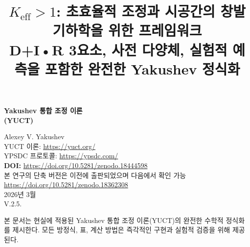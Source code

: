 \documentclass[11pt,a4paper]{article}
\title{$K_{\mathrm{eff}} > 1$: 초효율적 조정과 시공간의 창발 기하학을 위한 프레임워크 \\ 
	\large D+I•R 3요소, 사전 다양체, 실험적 예측을 포함한 완전한 Yakushev 정식화}
\begin{document}
	
	\begin{titlepage}
		\begin{center}
			\vspace*{3cm}
			\Huge\textbf{Yakushev 통합 조정 이론\\ (YUCT)}
			\vspace{2cm}
			
			\Large
			Alexey V. Yakushev\\
			\vspace{2cm}
			YUCT 이론: \url{https://yuct.org/}\\
			YPSDC 프로토콜: \url{https://ypsdc.com/}\\
			
			\vspace{2cm}
			\textbf{DOI:} \url{https://doi.org/10.5281/zenodo.18444598}\\
			
			\vspace{1cm}
			\large 
			본 연구의 단축 버전은 이전에 출판되었으며 다음에서 확인 가능\\
			\url{https://doi.org/10.5281/zenodo.18362308}\\
			\vspace{1cm}
			2026년 3월 \\ \large V.2.5.
			
			\vfill
			\normalsize
			본 문서는 현실에 적용된 Yakushev 통합 조정 이론(YUCT)의 완전한 수학적 정식화를 제시한다. 모든 방정식, 표, 계산 방법은 즉각적인 구현과 실험적 검증을 위해 제공된다.
		\end{center}
	\end{titlepage}
	
	\tableofcontents
	\newpage
	
\end{document}
